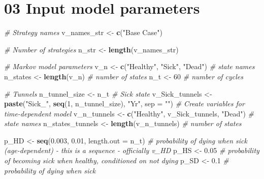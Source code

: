 \documentclass[
]{article}
\newenvironment{Shaded}{\begin{snugshade}}{\end{snugshade}}
\newcommand{\CommentTok}[1]{\textcolor[rgb]{0.56,0.35,0.01}{\textit{#1}}}
\newcommand{\DataTypeTok}[1]{\textcolor[rgb]{0.13,0.29,0.53}{#1}}
\newcommand{\DecValTok}[1]{\textcolor[rgb]{0.00,0.00,0.81}{#1}}
\newcommand{\FloatTok}[1]{\textcolor[rgb]{0.00,0.00,0.81}{#1}}
\newcommand{\KeywordTok}[1]{\textcolor[rgb]{0.13,0.29,0.53}{\textbf{#1}}}
\newcommand{\NormalTok}[1]{#1}
\newcommand{\StringTok}[1]{\textcolor[rgb]{0.31,0.60,0.02}{#1}}
\begin{document}
\hypertarget{input-model-parameters}{%
\section{03 Input model parameters}\label{input-model-parameters}}

\begin{Shaded}
\begin{Highlighting}[]
\CommentTok{# Strategy names}
\NormalTok{v_names_str <-}\StringTok{ }\KeywordTok{c}\NormalTok{(}\StringTok{"Base Case"}\NormalTok{)  }

\CommentTok{# Number of strategies}
\NormalTok{n_str <-}\StringTok{ }\KeywordTok{length}\NormalTok{(v_names_str)}

\CommentTok{# Markov model parameters}
\NormalTok{v_n  <-}\StringTok{ }\KeywordTok{c}\NormalTok{(}\StringTok{"Healthy"}\NormalTok{, }\StringTok{"Sick"}\NormalTok{, }\StringTok{"Dead"}\NormalTok{)    }\CommentTok{# state names}
\NormalTok{n_states  <-}\StringTok{ }\KeywordTok{length}\NormalTok{(v_n)                }\CommentTok{# number of states}
\NormalTok{n_t  <-}\StringTok{ }\DecValTok{60}                              \CommentTok{# number of cycles}

\CommentTok{# Tunnels}
\NormalTok{n_tunnel_size <-}\StringTok{ }\NormalTok{n_t}
\CommentTok{# Sick state}
\NormalTok{v_Sick_tunnels <-}\StringTok{ }\KeywordTok{paste}\NormalTok{(}\StringTok{"Sick_"}\NormalTok{, }\KeywordTok{seq}\NormalTok{(}\DecValTok{1}\NormalTok{, n_tunnel_size), }\StringTok{"Yr"}\NormalTok{, }\DataTypeTok{sep =} \StringTok{""}\NormalTok{)}
\CommentTok{# Create variables for time-dependent model}
\NormalTok{v_n_tunnels  <-}\StringTok{ }\KeywordTok{c}\NormalTok{(}\StringTok{"Healthy"}\NormalTok{, v_Sick_tunnels, }\StringTok{"Dead"}\NormalTok{)  }\CommentTok{# state names}
\NormalTok{n_states_tunnels  <-}\StringTok{ }\KeywordTok{length}\NormalTok{(v_n_tunnels)              }\CommentTok{# number of states}

\NormalTok{p_HD <-}\StringTok{ }\KeywordTok{seq}\NormalTok{(}\FloatTok{0.003}\NormalTok{, }\FloatTok{0.01}\NormalTok{, }\DataTypeTok{length.out =}\NormalTok{ n_t)  }\CommentTok{# probability of dying when sick (age-dependent) - this is a sequence - officially v_HD}
\NormalTok{p_HS <-}\StringTok{ }\FloatTok{0.05}                                \CommentTok{# probability of becoming sick when healthy, conditioned on not dying}
\NormalTok{p_SD <-}\StringTok{ }\FloatTok{0.1}                                 \CommentTok{# probability of dying when sick}


\end{Highlighting}
\end{Shaded}
\end{document}
